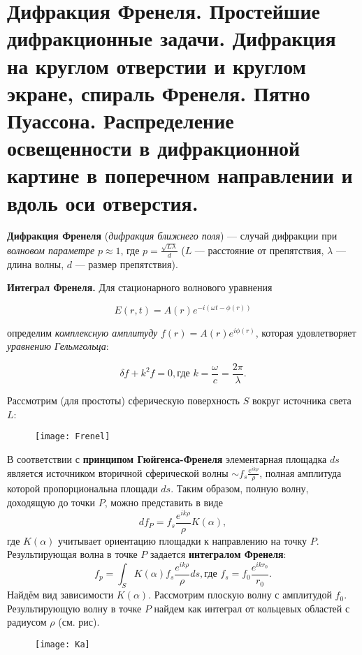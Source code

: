 \section{Дифракция Френеля. Простейшие дифракционные задачи. Дифракция на круглом отверстии и круглом экране, спираль Френеля. Пятно Пуассона. Распределение освещенности в дифракционной картине в поперечном направлении и вдоль оси отверстия.}

\textbf{Дифракция Френеля} (\textit{дифракция ближнего поля}) --- случай дифракции при \textit{волновом параметре} $p \approx 1$, где $p = \frac{\sqrt{L \lambda}}{d}$ ($L$ --- расстояние от препятствия, $\lambda$ --- длина волны, $d$ --- размер препятствия).

\textbf{Интеграл Френеля.} Для стационарного волнового уравнения 

\begin{equation}
E(r,t) = A(r) e^{-i(\omega t - \phi (r))}
\end{equation}

определим \textit{комплексную амплитуду} $f(r) = A(r)e^{i\phi(r)}$, которая удовлетворяет \textit{уравнению Гельмгольца}:

\begin{equation}
\delta f + k^2 f = 0, \mbox{где } k = \frac{\omega}{c}=\frac{2\pi}{\lambda}.
\end{equation}

Рассмотрим (для простоты) сферическую поверхность $S$ вокруг источника света $L$:

\begin{figure}[H]
	\centering
	\texttt{[image: Frenel]}
\end{figure}

В соответствии с \textbf{принципом Гюйгенса-Френеля} элементарная площадка $ds$ является источником вторичной сферической волны $\sim f_s \frac{e^{ik\rho}}{\rho}$, полная амплитуда которой пропорциональна площади $ds$. 
Таким образом, полную волну, доходящую до точки $P$, можно представить в виде $$df_P = f_s \frac{e^{ik\rho}}{\rho} K(\alpha),$$ где $K(\alpha)$ учитывает ориентацию площадки к направлению на точку $P$.
Результирующая волна в точке $P$ задается \textbf{интегралом Френеля}:
$$f_p = \int_{S}K(\alpha)f_s\frac{e^{ik\rho}}{\rho}ds, \mbox{где } f_s=f_0\frac{e^{ikr_0}}{r_0}.$$
Найдём вид зависимости $K(\alpha)$. Рассмотрим плоскую волну с амплитудой $f_0$. Результирующую волну в точке $P$ найдем как интеграл от кольцевых областей с радиусом $\rho$ (см. рис).
\begin{figure}[H]
	\centering
	\texttt{[image: Ka]}
\end{figure}

